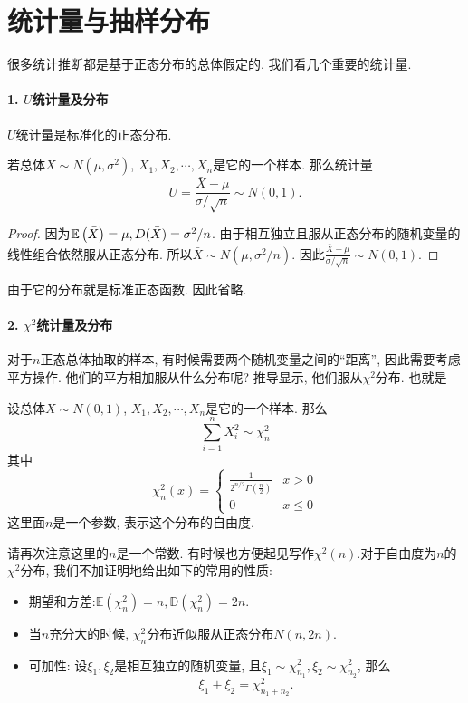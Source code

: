 \section{统计量与抽样分布}

很多统计推断都是基于正态分布的总体假定的. 我们看几个重要的统计量. 

\paragraph{1. $U$统计量及分布}  

$U$统计量是标准化的正态分布. 

\begin{theorem}
    若总体$X\sim N(\mu, \sigma^2)$, $X_1, X_2, \cdots, X_n$是它的一个样本. 那么统计量
    $$
    U=\frac{\bar X-\mu}{\sigma/\sqrt n} \sim N(0, 1).
    $$
\end{theorem}

\begin{proof}
    因为$\mathbb E\left(\bar X\right)=\mu, D(\bar X)=\sigma^2 /n$. 由于相互独立且服从正态分布的随机变量的线性组合依然服从正态分布. 所以$\bar X\sim N(\mu, \sigma^2 / n)$. 因此$\frac{\bar X -\mu}{\sigma / \sqrt n}\sim N(0, 1)$.
\end{proof}

由于它的分布就是标准正态函数. 因此省略. 

\paragraph{2. $\chi^2$统计量及分布}

对于$n$正态总体抽取的样本, 有时候需要两个随机变量之间的``距离'', 因此需要考虑平方操作. 他们的平方相加服从什么分布呢? 推导显示, 他们服从$\chi^2$分布. 也就是

\begin{definition}
    设总体$X\sim N(0, 1)$, $X_1, X_2, \cdots, X_n$是它的一个样本. 那么
    $$
    \sum_{i=1}^n X_i ^2 \sim \chi^2_n
    $$
    其中
    $$
    \chi^2_n(x)=\begin{cases}
        \frac{1}{2^{n/2}\Gamma\left(\frac n2\right)} & x>0\\
        0 & x\leq 0
    \end{cases}
    $$
    这里面$n$是一个参数, 表示这个分布的自由度. 
\end{definition}

请再次注意这里的$n$是一个常数. 有时候也方便起见写作$\chi^2(n)$.对于自由度为$n$的$\chi^2$分布, 我们不加证明地给出如下的常用的性质:
\begin{theorem}
    \begin{itemize}
        \item 期望和方差:$\mathbb E (\chi^2_n)=n, \mathbb D(\chi^2_n)=2n$.
        \item 当$n$充分大的时候, $\chi^2_n$分布近似服从正态分布$N(n, 2n)$.
        \item 可加性: 设$\xi_1, \xi_2$是相互独立的随机变量, 且$\xi_1 \sim \chi^2_{n_1}, \xi_2 \sim \chi^2_{n_2}$, 那么$$\xi_1+\xi_2=\chi_{n_1+n_2}^2.$$
    \end{itemize}
\end{theorem}


